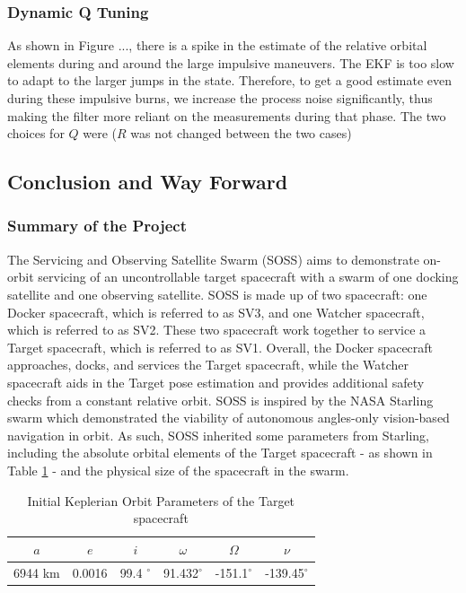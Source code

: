 \subsubsection{Dynamic Q Tuning}
As shown in Figure ..., there is a spike in the estimate of the relative orbital elements during and around the large impulsive maneuvers. The EKF is too slow to adapt to the larger jumps in the state. Therefore, to get a good estimate even during these impulsive burns, we increase the process noise significantly, thus making the filter more reliant on the measurements during that phase. The two choices for $Q$ were ($R$ was not changed between the two cases)


\newpage
\subsection{Conclusion and Way Forward}
\subsubsection{Summary of the Project}
The Servicing and Observing Satellite Swarm (SOSS) aims to demonstrate on-orbit servicing of an uncontrollable target spacecraft with a swarm of one docking satellite and one observing satellite. SOSS is made up of two spacecraft: one Docker spacecraft, which is referred to as SV3, and one Watcher spacecraft, which is referred to as SV2. These two spacecraft work together to service a Target spacecraft, which is referred to as SV1. Overall, the Docker spacecraft approaches, docks, and services the Target spacecraft, while the Watcher spacecraft aids in the Target pose estimation and provides additional safety checks from a constant relative orbit. SOSS is inspired by the NASA Starling swarm which demonstrated the viability of autonomous angles-only vision-based navigation in orbit. As such, SOSS inherited some parameters from Starling, including the absolute orbital elements of the Target spacecraft - as shown in Table \ref{tab:abs_oe_kepler_summary} - and the physical size of the spacecraft in the swarm. 

\begin{table}[h]
\centering
\begin{tabular}{cccccc} \hline
    $a$ & $e$ & $i$ & $\omega$ & $\Omega$ & $\nu$ \\ \hline 
     6944 km & 0.0016 & 99.4 $^\circ$ & 91.432$^\circ$ & -151.1$^\circ$ & -139.45$^\circ$ \\ \hline
\end{tabular}
\caption{Initial Keplerian Orbit Parameters of the Target spacecraft}
\label{tab:abs_oe_kepler_summary}
\end{table}

